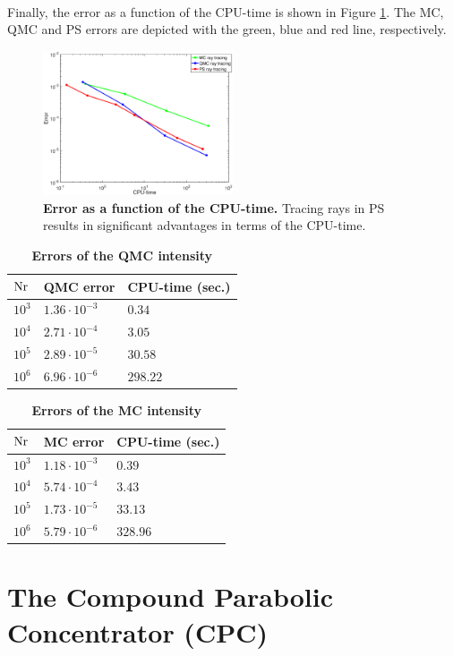 \\ \indent
Finally, the error as a function of the CPU-time is shown in Figure \ref{fig:error_time_pr}. The MC, QMC and PS errors are depicted with the green, blue and red line, respectively. 
\begin{figure}[h!]
  \center
  \includegraphics[width = 0.5\textwidth]{error_time_pr}
  \caption{\textbf{Error as a function of the CPU-time.} Tracing rays in PS results in significant advantages in terms of the CPU-time.}
  \label{fig:error_time_pr}
\end{figure} 
\begin{table}[ht] \label{tab:table_tir_triangulation}
\centering
\caption{\bf Errors of the QMC intensity}
\begin{tabular}{lll}
 \hline   $\textrm{Nr}$ & QMC error & CPU-time (sec.) \\
  \hline 
 $10^3$     & $1.36\cdot10^{-3}$ & $0.34$\\
 $10^4$     & $2.71\cdot 10^{-4}$ & $3.05$ \\
 $10^5$     & $2.89\cdot 10^{-5}$ & $30.58$\\
 $10^6$     & $6.96\cdot 10^{-6}$ & $298.22$\\
 \hline
 \end{tabular}
 \label{tab:ps_error_triangulation}
 \end{table}
\begin{table}[ht] \label{tab:table_tir_triangulation}
\centering
\caption{\bf Errors of the MC intensity}
\begin{tabular}{lll}
 \hline   $\textrm{Nr}$ & MC error & CPU-time (sec.) \\
  \hline 
 $10^3$     & $1.18\cdot10^{-3}$ & $0.39$\\
 $10^4$     & $5.74\cdot 10^{-4}$ & $3.43$ \\
 $10^5$     & $1.73\cdot 10^{-5}$ & $33.13$\\
 $10^6$     & $5.79\cdot 10^{-6}$ & $328.96$\\
 \hline
 \end{tabular}
 \label{tab:ps_error_triangulation}
 \end{table}

\section{The Compound Parabolic Concentrator (CPC)}
